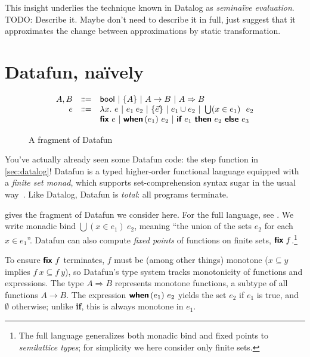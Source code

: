 \documentclass[sigplan,screen,review,timestamp,dvipsnames]{acmart}
\newcommand{\todo}[1]{{\color{ACMPurple}#1}}
\newcommand{\bnfeq}{\dblcolon=}
\newcommand{\bnfcont}{}
\newcommand{\pipe}{~|~}
\newcommand{\fn}{\lambda}
\newcommand{\binder}{.~}
\newcommand{\bind}[1]{#1\binder}
\newcommand{\fnof}[1]{\fn\bind{#1}}
\newcommand{\kw}[1]{\textsf{\bfseries #1}}
\newcommand{\tlv}[1]{\textsf{#1}}
\newcommand{\mto}{\overset{+}{\to}}
\renewcommand{\mto}{\Rightarrow}
\newcommand{\tset}[1]{\{#1\}}
\newcommand{\tbool}{\textsf{bool}}
\newcommand{\eset}[1]{\{#1\}}
\newcommand{\ewhen}[1]{\kw{when}\,(#1)~}
\newcommand{\eif}[2]{\kw{if}~#1~\kw{then}~#2~\kw{else}~}
\newcommand{\efor}[1]{\bigcup(#1)~}
\newcommand{\efix}{\kw{fix}~}
\begin{document}
This insight underlies the technique known in Datalog as \emph{semina\"ive
  evaluation}. \todo{TODO: Describe it. Maybe don't need to describe it in full,
  just suggest that it approximates the change between approximations by static
  transformation.}


\section{Datafun, na\"ively}

\begin{figure}
  \[
  \begin{array}{rcl}
    A,B &\bnfeq& \tbool \pipe \tset{A} \pipe A \to B \pipe A \mto B
    \\
    e &\bnfeq& \fnof{x} e \pipe e_1\:e_2 \pipe \eset{\vec{e}} \pipe e_1 \cup e_2
    \pipe \efor{x \in e_1}~ e_2
    \\ &\bnfcont&  \efix e \pipe \ewhen{e_1} e_2 \pipe \eif{e_1}{e_2}{e_3}
  \end{array}
  \]\vspace{-1em}
  \caption{A fragment of Datafun}
  \label{fig:datafun}
\end{figure}

You've actually already seen some Datafun code: the \tlv{step} function in
\cref{sec:datalog}! Datafun is a typed higher-order functional language equipped
with a \emph{finite set monad}, which supports set-comprehension syntax sugar in
the usual way~\cite{comprehending-monads}. Like Datalog, Datafun is
\emph{total}: all programs terminate.

 gives the fragment of Datafun we consider here. For the full
language, see \citet{datafun}. We write monadic bind $\efor{x \in e_1} e_2$,
meaning ``the union of the sets $e_2$ for each $x \in e_1$''.
%
Datafun can also compute \emph{fixed points} of functions on finite sets, $\efix
f$.\footnote{The full language generalizes both monadic bind and fixed points to
  \emph{semilattice types}; for simplicity we here consider only finite sets.}

To ensure $\efix f$ terminates, $f$ must be (among other things) monotone ($x
\subseteq y$ implies $f\:x \subseteq f\:y$), so Datafun's type system tracks
monotonicity of functions and expressions.
%
The type $A \mto B$ represents monotone functions, a subtype of all functions $A
\to B$. The expression $\ewhen{e_1}{e_2}$ yields the set $e_2$ if $e_1$ is true,
and $\emptyset$ otherwise; unlike \kw{if}, this is always monotone in $e_1$.
\end{document}
